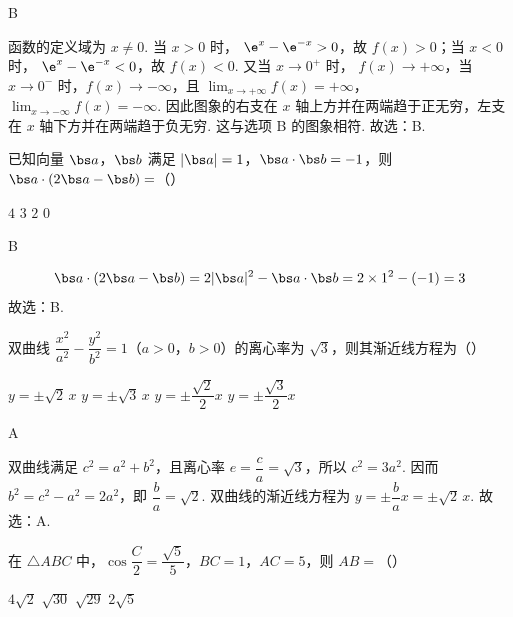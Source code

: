 \begin{answer}
B
\end{answer}

\begin{solution}
函数的定义域为 \(x\ne0\). 当 \(x>0\) 时，
\(\e^x-\e^{-x}>0\)，故 \(f(x)>0\)；当 \(x<0\) 时，
\(\e^x-\e^{-x}<0\)，故 \(f(x)<0\). 又当 \(x\to0^+\) 时，
\(f(x)\to+\infty\)，当 \(x\to0^-\) 时，\(f(x)\to-\infty\)，且
\(\displaystyle\lim_{x\to+\infty}f(x)=+\infty\)，
\(\displaystyle\lim_{x\to-\infty}f(x)=-\infty\). 因此图象的右支在 \(x\) 轴上方并在两端趋于正无穷，左支在 \(x\) 轴下方并在两端趋于负无穷. 这与选项 B 的图象相符.
故选：B.
\end{solution}

\begin{problem}
已知向量 \(\bs a\)，\(\bs b\) 满足 \(|\bs a|=1\)，\(\bs a\cdot\bs b=-1\)，则 \(\bs a\cdot(2\bs a-\bs b)=\)（\quad）

\choices
    {\(4\)}
    {\(3\)}
    {\(2\)}
    {\(0\)}
\end{problem}

\begin{answer}
B
\end{answer}

\begin{solution}
\[
\bs a\cdot(2\bs a-\bs b)=2|\bs a|^2-\bs a\cdot\bs b=2\times1^2-(-1)=3
\]
故选：B.
\end{solution}

\begin{problem}
双曲线 \(\dfrac{x^2}{a^2}-\dfrac{y^2}{b^2}=1\)（\(a>0\)，\(b>0\)）的离心率为 \(\sqrt3\)，则其渐近线方程为（\quad）

\choices
    {\(y=\pm\sqrt2\,x\)}
    {\(y=\pm\sqrt3\,x\)}
    {\(y=\pm\dfrac{\sqrt2}{2}x\)}
    {\(y=\pm\dfrac{\sqrt3}{2}x\)}
\end{problem}

\begin{answer}
A
\end{answer}

\begin{solution}
双曲线满足 \(c^2=a^2+b^2\)，且离心率
\(e=\dfrac ca=\sqrt3\)，所以 \(c^2=3a^2\). 因而
\(b^2=c^2-a^2=2a^2\)，即 \(\dfrac ba=\sqrt2\). 双曲线的渐近线方程为
\(y=\pm\dfrac ba x=\pm\sqrt2\,x\).
故选：A.
\end{solution}

\begin{problem}
在 \(\triangle ABC\) 中，\(\cos\dfrac C2=\dfrac{\sqrt5}{5}\)，\(BC=1\)，\(AC=5\)，则 \(AB=\)（\quad）

\choices
    {\(4\sqrt2\)}
    {\(\sqrt{30}\)}
    {\(\sqrt{29}\)}
    {\(2\sqrt5\)}
\end{problem}

